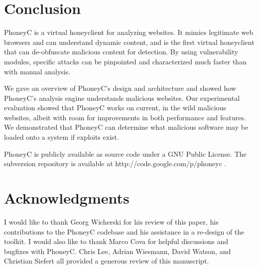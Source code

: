 \documentclass[10pt,twocolumn]{article}
\begin{document}
\section{Conclusion}
\label{conclusion}

PhoneyC is a virtual honeyclient for analyzing websites. It mimics legitimate web browsers and can understand dynamic content, and is the first virtual honeyclient that can de-obfuscate malicious content for detection. By using vulnerability modules, specific attacks can be pinpointed and characterized much faster than with manual analysis. 

We gave an overview of PhoneyC's design and architecture and showed how PhoneyC's analysis engine understands malicious websites. Our experimental evaluation showed that PhoneyC works on current, in the wild malicious websites, albeit with room for improvements in both performance and features. We demonstrated that PhoneyC can determine what malicious software may be loaded onto a system if exploits exist. 

PhoneyC is publicly available as source code under a GNU Public License. The subversion repository is available at http://code.google.com/p/phoneyc .

\section*{Acknowledgments}
\label{acks}

I would like to thank Georg Wicherski for his review of this paper, his contributions to the PhoneyC codebase and his assistance in a re-design of the toolkit. I would also like to thank Marco Cova for helpful discussions and bugfixes with PhoneyC. Chris Lee, Adrian Wiesmann, David Watson, and Christian Siefert all provided a generous review of this manuscript.

\scriptsize


\normalsize
\end{document}
